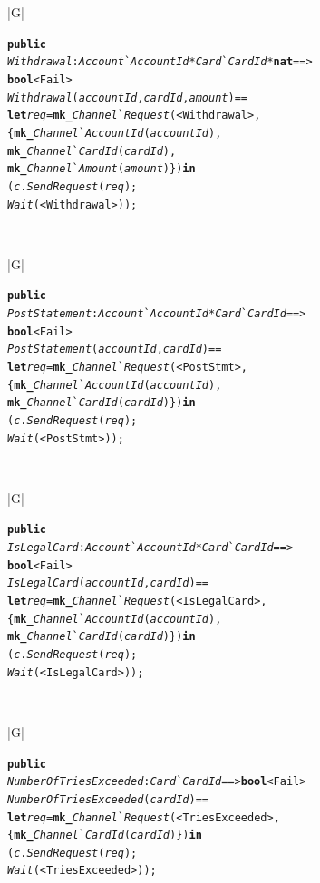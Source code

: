 \documentclass[\pformat,12pt,twoside]{article}
\newenvironment{VDMgray}%
{\begin{tabular}{|G|}\hline\small\begin{alltt}}%
{\end{alltt}\normalsize\\
 \hline\end{tabular}}
\begin{document}
\begin{VDMgray}
 \textbf{public}
 \textit{Withdrawal} : \textit{Account}\`{}\textit{AccountId} * \textit{Card}\`{}\textit{CardId} * \textbf{nat} ==\texttt{>}
           \textbf{bool} {\textbar} \texttt{<}Fail\texttt{>}
 \textit{Withdrawal}(\textit{accountId},\textit{cardId},\textit{amount}) ==
   \textbf{let} \textit{req} = \textbf{mk\_}\textit{Channel}\`{}\textit{Request}(\texttt{<}Withdrawal\texttt{>},
             \{\textbf{mk\_}\textit{Channel}\`{}\textit{AccountId}(\textit{accountId}),
              \textbf{mk\_}\textit{Channel}\`{}\textit{CardId}(\textit{cardId}),
              \textbf{mk\_}\textit{Channel}\`{}\textit{Amount}(\textit{amount})\}) \textbf{in}
     (\textit{c}.\textit{SendRequest}(\textit{req});
      \textit{Wait}(\texttt{<}Withdrawal\texttt{>}));
\end{VDMgray}

\begin{VDMgray}
 \textbf{public}
 \textit{PostStatement} : \textit{Account}\`{}\textit{AccountId} * \textit{Card}\`{}\textit{CardId} ==\texttt{>}
                 \textbf{bool} {\textbar} \texttt{<}Fail\texttt{>}
 \textit{PostStatement}(\textit{accountId},\textit{cardId}) ==
   \textbf{let} \textit{req} = \textbf{mk\_}\textit{Channel}\`{}\textit{Request}(\texttt{<}PostStmt\texttt{>},
              \{\textbf{mk\_}\textit{Channel}\`{}\textit{AccountId}(\textit{accountId}),
               \textbf{mk\_}\textit{Channel}\`{}\textit{CardId}(\textit{cardId})\}) \textbf{in}
     (\textit{c}.\textit{SendRequest}(\textit{req});
      \textit{Wait}(\texttt{<}PostStmt\texttt{>}));
\end{VDMgray}

\begin{VDMgray}
 \textbf{public}
 \textit{IsLegalCard} : \textit{Account}\`{}\textit{AccountId} * \textit{Card}\`{}\textit{CardId} ==\texttt{>}
              \textbf{bool} {\textbar} \texttt{<}Fail\texttt{>}
 \textit{IsLegalCard}(\textit{accountId},\textit{cardId}) ==
   \textbf{let} \textit{req} = \textbf{mk\_}\textit{Channel}\`{}\textit{Request}(\texttt{<}IsLegalCard\texttt{>},
              \{\textbf{mk\_}\textit{Channel}\`{}\textit{AccountId}(\textit{accountId}),
               \textbf{mk\_}\textit{Channel}\`{}\textit{CardId}(\textit{cardId})\}) \textbf{in}
     (\textit{c}.\textit{SendRequest}(\textit{req});
      \textit{Wait}(\texttt{<}IsLegalCard\texttt{>}));
\end{VDMgray}

\begin{VDMgray}
 \textbf{public}
 \textit{NumberOfTriesExceeded} : \textit{Card}\`{}\textit{CardId} ==\texttt{>} \textbf{bool} {\textbar} \texttt{<}Fail\texttt{>}
 \textit{NumberOfTriesExceeded}(\textit{cardId}) ==
   \textbf{let} \textit{req} = \textbf{mk\_}\textit{Channel}\`{}\textit{Request}(\texttt{<}TriesExceeded\texttt{>},
              \{\textbf{mk\_}\textit{Channel}\`{}\textit{CardId}(\textit{cardId})\}) \textbf{in}
     (\textit{c}.\textit{SendRequest}(\textit{req});
      \textit{Wait}(\texttt{<}TriesExceeded\texttt{>}));
\end{VDMgray}
\end{document}
